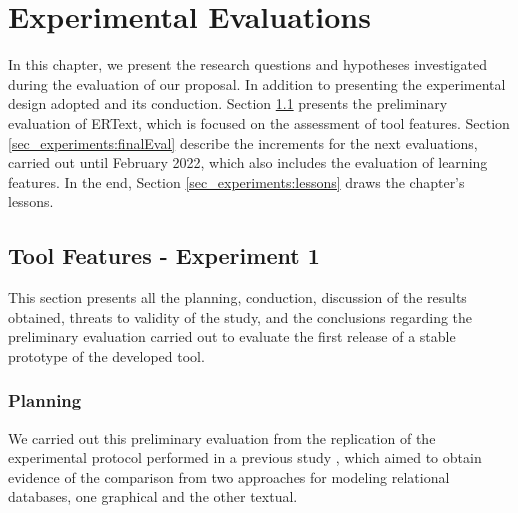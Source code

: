 \chapter{Experimental Evaluations}\label{chap:experiments}

In this chapter, we present the research questions and hypotheses investigated during the evaluation of our proposal. 
In addition to presenting the experimental design adopted and its conduction.
Section \ref{sec_experiments:preliminaryEval} presents the preliminary evaluation of ERText, which is focused on the assessment of tool features. Section \ref{sec_experiments:finalEval} describe the increments for the next evaluations, carried out until February 2022, which also includes the evaluation of learning features.
In the end, Section \ref{sec_experiments:lessons} draws the chapter's lessons.

\section{Tool Features - Experiment 1} 
\label{sec_experiments:preliminaryEval}

This section presents all the planning, conduction, discussion of the results obtained, threats to validity of the study, and the conclusions regarding the preliminary evaluation carried out to evaluate the first release of a stable prototype of the developed tool.

\subsection{Planning}
\label{ssec_experiments:preliminary_planning}

We carried out this preliminary evaluation from the replication of the experimental protocol performed in a previous study \cite{Lopes:2019}, which aimed to obtain evidence of the comparison from two approaches for modeling relational databases, one graphical and the other textual.

